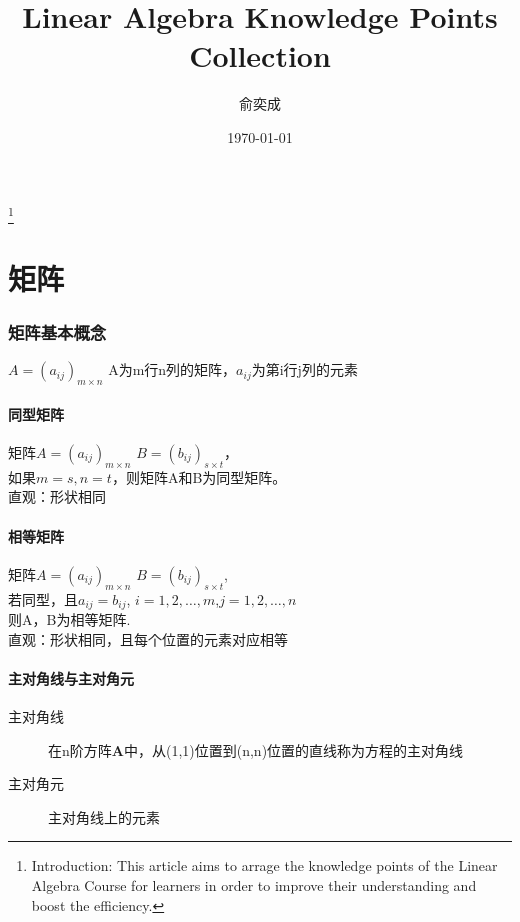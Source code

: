 \documentclass[UTF-8,a4paper]{ctexart}
\begin{document}
\title{Linear Algebra Knowledge Points Collection}
\author{\kaishu 俞奕成}
\date{\kaishu \today}
\maketitle

\thanks{Introduction: This article aims to arrage the knowledge points of the Linear Algebra Course for learners in order to improve their understanding and boost the efficiency.}
\setcounter{tocdepth}{2}
\tableofcontents

\newpage

\part{矩阵}
\section{矩阵基本概念}
\(A=(a_{ij})_{m\times n}\)
A为m行n列的矩阵，\(a_{ij}\)为第i行j列的元素

\subsection{同型矩阵}
\kaishu
矩阵\(A=(a_{ij})_{m\times n}\) \(B=(b_{ij})_{s\times t}\)，\\如果\(m=s,n=t\)，则矩阵A和B为同型矩阵。
\\直观：形状相同

\subsection{相等矩阵}
\kaishu
矩阵\(A=(a_{ij})_{m\times n}\) \(B=(b_{ij})_{s\times t}\),\\
若同型，且\(a_{ij}=b_{ij}\), \(i=1,2,\dots ,m\),\(j=1,2,\dots ,n\)
\\则A，B为相等矩阵.
\\直观：形状相同，且每个位置的元素对应相等

\subsection{主对角线与主对角元}
\begin{description}
    \item[主对角线] \kaishu 在n阶方阵\(\mathbf{A}\)中，从(1,1)位置到(n,n)位置的直线称为方程的主对角线
    \item[主对角元] \kaishu 主对角线上的元素
\end{description}
\end{document}
